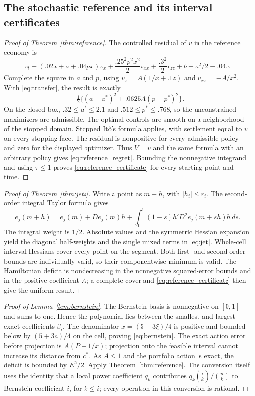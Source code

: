 \subsection{The stochastic reference and its interval certificates}
\begin{proof}[Proof of Theorem~\ref{thm:reference}]
The controlled residual of $v$ in the reference economy is
\[
 v_t+(.02x+a+.04px)v_x+\frac{.25^2p^2x^2}{2}v_{xx}
 +\frac{.3^2}{2}v_{zz}+b-a^2/2-.04v.
\]
Complete the square in $a$ and $p$, using $v_x=A(1/x+.1z)$ and $v_{xx}=-A/x^2$. With \eqref{eq:transfer}, the result is exactly
\[
 -\tfrac12\{(a-a^*)^2+.0625A(p-p^*)^2\}.
\]
On the closed box, $.32\leq a^*\leq2.1$ and $.512\leq p^*\leq.768$, so the unconstrained maximizers are admissible. The optimal controls are smooth on a neighborhood of the stopped domain. Stopped It\^o's formula applies, with settlement equal to $v$ on every stopping face. The residual is nonpositive for every admissible policy and zero for the displayed optimizer. Thus $V=v$ and the same formula with an arbitrary policy gives \eqref{eq:reference_regret}. Bounding the nonnegative integrand and using $\tau\leq1$ proves \eqref{eq:reference_certificate} for every starting point and time.
\end{proof}
\begin{proof}[Proof of Theorem~\ref{thm:jets}]
Write a point as $m+h$, with $|h_i|\leq r_i$. The second-order integral Taylor formula gives
\[
 e_j(m+h)=e_j(m)+De_j(m)h+\int_0^1(1-s)h'D^2e_j(m+sh)h\,ds.
\]
The integral weight is $1/2$. Absolute values and the symmetric Hessian expansion yield the diagonal half-weights and the single mixed terms in \eqref{eq:jet}. Whole-cell interval Hessians cover every point on the segment. Both first- and second-order bounds are individually valid, so their componentwise minimum is valid. The Hamiltonian deficit is nondecreasing in the nonnegative squared-error bounds and in the positive coefficient $A$; a complete cover and \eqref{eq:reference_certificate} then give the uniform result.
\end{proof}
\begin{proof}[Proof of Lemma~\ref{lem:bernstein}]
The Bernstein basis is nonnegative on $[0,1]$ and sums to one. Hence the polynomial lies between the smallest and largest exact coefficients $\beta_i$. The denominator $x=(5+3\xi)/4$ is positive and bounded below by $(5+3a)/4$ on the cell, proving \eqref{eq:bernstein}. The exact action error before projection is $A(P-1/x)$; projection onto the feasible interval cannot increase its distance from $a^*$. As $A\leq1$ and the portfolio action is exact, the deficit is bounded by $E^2/2$. Apply Theorem~\ref{thm:reference}. The conversion itself uses the identity that a local power coefficient $q_k$ contributes $q_k{ i\choose k}/{n\choose k}$ to Bernstein coefficient $i$, for $k\leq i$; every operation in this conversion is rational.
\end{proof}
